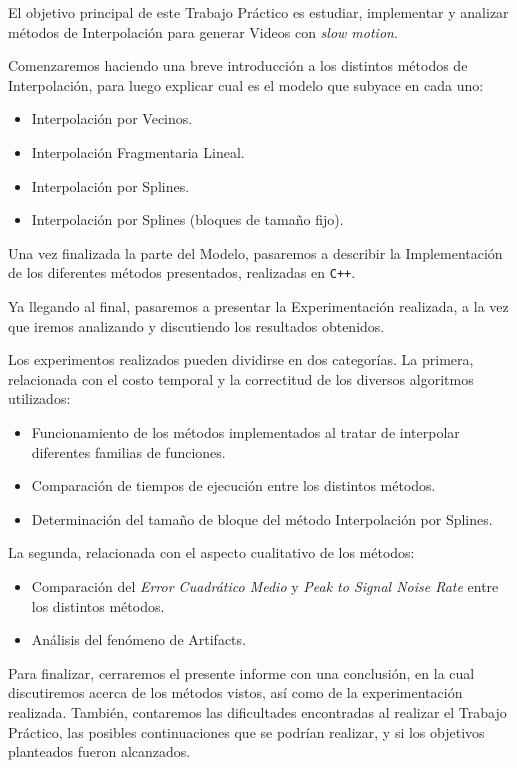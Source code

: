  El objetivo principal de este Trabajo Práctico es estudiar, implementar y analizar
 métodos de Interpolación para generar Videos con \textit{slow motion}.

Comenzaremos haciendo una breve introducción a los distintos métodos de Interpolación,
para luego explicar cual es el modelo que subyace en cada uno:
\begin{itemize}
    \item Interpolación por Vecinos.
    \item Interpolación Fragmentaria Lineal.
    \item Interpolación por Splines.
    \item Interpolación por Splines (bloques de tamaño fijo).
\end{itemize}

Una vez finalizada la parte del Modelo, pasaremos a describir la Implementación de los
diferentes métodos presentados, realizadas en \texttt{C++}.

Ya llegando al final, pasaremos a presentar la Experimentación realizada, a la vez
que iremos analizando y discutiendo los resultados obtenidos.

Los experimentos realizados pueden dividirse en dos categorías. La primera, relacionada
con el costo temporal y la correctitud de los diversos algoritmos utilizados:
\begin{itemize}
    \item Funcionamiento de los métodos implementados al tratar de interpolar diferentes
        familias de funciones.
    \item Comparación de tiempos de ejecución entre los distintos métodos.
    \item Determinación del tamaño de bloque del método Interpolación por Splines.
\end{itemize}

La segunda, relacionada con el aspecto cualitativo de los métodos:
\begin{itemize}
    \item Comparación del \textit{Error Cuadrático Medio} y \textit{Peak to Signal Noise Rate} entre
        los distintos métodos.
    \item Análisis del fenómeno de Artifacts.
\end{itemize}

Para finalizar, cerraremos el presente informe con una conclusión, en la cual
discutiremos acerca de los métodos vistos, así como de la experimentación realizada.
También, contaremos las dificultades encontradas al realizar el Trabajo Práctico,
las posibles continuaciones que se podrían realizar, y si los objetivos planteados
fueron alcanzados.

